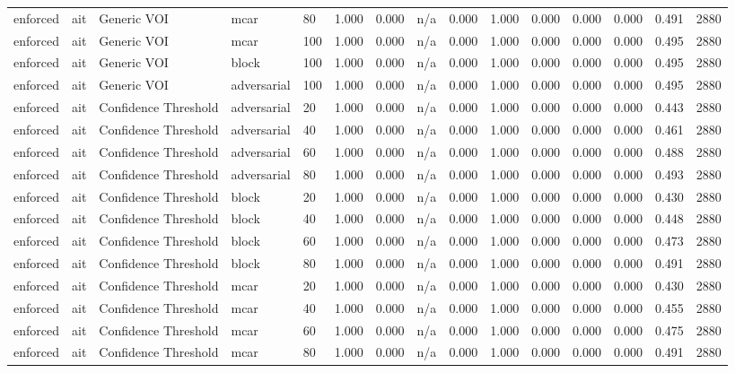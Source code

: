 \begin{table}[!ht]
{\begin{tabular}{lllllllllllllll}
enforced & ait & Generic VOI & mcar & 80 & 1.000 & 0.000 & n/a & 0.000 & 1.000 & 0.000 & 0.000 & 0.000 & 0.491 & 2880 \\
enforced & ait & Generic VOI & mcar & 100 & 1.000 & 0.000 & n/a & 0.000 & 1.000 & 0.000 & 0.000 & 0.000 & 0.495 & 2880 \\
enforced & ait & Generic VOI & block & 100 & 1.000 & 0.000 & n/a & 0.000 & 1.000 & 0.000 & 0.000 & 0.000 & 0.495 & 2880 \\
enforced & ait & Generic VOI & adversarial & 100 & 1.000 & 0.000 & n/a & 0.000 & 1.000 & 0.000 & 0.000 & 0.000 & 0.495 & 2880 \\
enforced & ait & Confidence Threshold & adversarial & 20 & 1.000 & 0.000 & n/a & 0.000 & 1.000 & 0.000 & 0.000 & 0.000 & 0.443 & 2880 \\
enforced & ait & Confidence Threshold & adversarial & 40 & 1.000 & 0.000 & n/a & 0.000 & 1.000 & 0.000 & 0.000 & 0.000 & 0.461 & 2880 \\
enforced & ait & Confidence Threshold & adversarial & 60 & 1.000 & 0.000 & n/a & 0.000 & 1.000 & 0.000 & 0.000 & 0.000 & 0.488 & 2880 \\
enforced & ait & Confidence Threshold & adversarial & 80 & 1.000 & 0.000 & n/a & 0.000 & 1.000 & 0.000 & 0.000 & 0.000 & 0.493 & 2880 \\
enforced & ait & Confidence Threshold & block & 20 & 1.000 & 0.000 & n/a & 0.000 & 1.000 & 0.000 & 0.000 & 0.000 & 0.430 & 2880 \\
enforced & ait & Confidence Threshold & block & 40 & 1.000 & 0.000 & n/a & 0.000 & 1.000 & 0.000 & 0.000 & 0.000 & 0.448 & 2880 \\
enforced & ait & Confidence Threshold & block & 60 & 1.000 & 0.000 & n/a & 0.000 & 1.000 & 0.000 & 0.000 & 0.000 & 0.473 & 2880 \\
enforced & ait & Confidence Threshold & block & 80 & 1.000 & 0.000 & n/a & 0.000 & 1.000 & 0.000 & 0.000 & 0.000 & 0.491 & 2880 \\
enforced & ait & Confidence Threshold & mcar & 20 & 1.000 & 0.000 & n/a & 0.000 & 1.000 & 0.000 & 0.000 & 0.000 & 0.430 & 2880 \\
enforced & ait & Confidence Threshold & mcar & 40 & 1.000 & 0.000 & n/a & 0.000 & 1.000 & 0.000 & 0.000 & 0.000 & 0.455 & 2880 \\
enforced & ait & Confidence Threshold & mcar & 60 & 1.000 & 0.000 & n/a & 0.000 & 1.000 & 0.000 & 0.000 & 0.000 & 0.475 & 2880 \\
enforced & ait & Confidence Threshold & mcar & 80 & 1.000 & 0.000 & n/a & 0.000 & 1.000 & 0.000 & 0.000 & 0.000 & 0.491 & 2880 \\

\end{tabular}}
\end{table}
